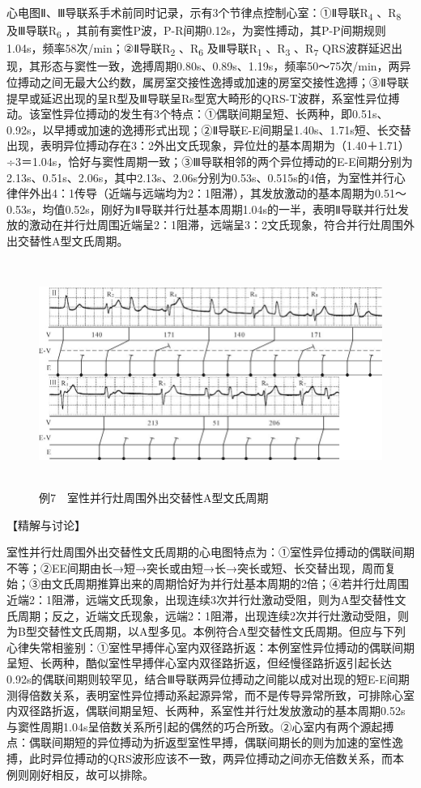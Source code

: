 心电图Ⅱ、Ⅲ导联系手术前同时记录，示有3个节律点控制心室：①Ⅱ导联R\textsubscript{4}
、R\textsubscript{8} 及Ⅲ导联R\textsubscript{6}
，其前有窦性P波，P-R间期0.12s，为窦性搏动，其P-P间期规则1.04s，频率58次/min；②Ⅱ导联R\textsubscript{2}
、R\textsubscript{6} 及Ⅲ导联R\textsubscript{1} 、R\textsubscript{3}
、R\textsubscript{7}
QRS波群延迟出现，其形态与窦性一致，逸搏周期0.80s、0.89s、1.19s，频率50～75次/min，两异位搏动之间无最大公约数，属房室交接性逸搏或加速的房室交接性逸搏；③Ⅱ导联提早或延迟出现的呈R型及Ⅲ导联呈Rs型宽大畸形的QRS-T波群，系室性异位搏动。该室性异位搏动的发生有3个特点：①偶联间期呈短、长两种，即0.51s、0.92s，以早搏或加速的逸搏形式出现；②Ⅱ导联E-E间期呈1.40s、1.71s短、长交替出现，表明异位搏动存在3：2外出文氏现象，异位灶的基本周期为（1.40＋1.71）÷3＝1.04s，恰好与窦性周期一致；③Ⅲ导联相邻的两个异位搏动的E-E间期分别为2.13s、0.51s、2.06s，其中2.13s、2.06s分别为0.53s、0.515s的4倍，为室性并行心律伴外出4：1传导（近端与远端均为2：1阻滞），其发放激动的基本周期为0.51～0.53s，均值0.52s，刚好为Ⅱ导联并行灶基本周期1.04s的一半，表明Ⅱ导联并行灶发放的激动在并行灶周围近端呈2：1阻滞，远端呈3：2文氏现象，符合并行灶周围外出交替性A型文氏周期。

\begin{figure}[!htbp]
 \centering
 \includegraphics[width=5.73958in,height=2.90625in]{./images/Image00765.jpg}
 \captionsetup{justification=centering}
 \caption{例7　室性并行灶周围外出交替性A型文氏周期}
 \label{fig50-7}
  \end{figure} 

【精解与讨论】

室性并行灶周围外出交替性文氏周期的心电图特点为：①室性异位搏动的偶联间期不等；②EE间期由长→短→突长或由短→长→突长或短、长交替出现，周而复始；③由文氏周期推算出来的周期恰好为并行灶基本周期的2倍；④若并行灶周围近端2：1阻滞，远端文氏现象，出现连续3次并行灶激动受阻，则为A型交替性文氏周期；反之，近端文氏现象，远端2：1阻滞，出现连续2次并行灶激动受阻，则为B型交替性文氏周期，以A型多见。本例符合A型交替性文氏周期。但应与下列心律失常相鉴别：①室性早搏伴心室内双径路折返：本例室性异位搏动的偶联间期呈短、长两种，酷似室性早搏伴心室内双径路折返，但经慢径路折返引起长达0.92s的偶联间期则较罕见，结合Ⅲ导联两异位搏动之间能以成对出现的短E-E间期测得倍数关系，表明室性异位搏动系起源异常，而不是传导异常所致，可排除心室内双径路折返，偶联间期呈短、长两种，系室性并行灶发放激动的基本周期0.52s与窦性周期1.04s呈倍数关系所引起的偶然的巧合所致。②心室内有两个源起搏点：偶联间期短的异位搏动为折返型室性早搏，偶联间期长的则为加速的室性逸搏，此时异位搏动的QRS波形应该不一致，两异位搏动之间亦无倍数关系，而本例则刚好相反，故可以排除。

